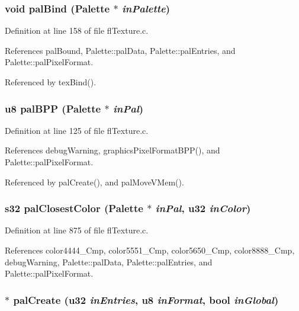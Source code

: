 \subsubsection{\setlength{\rightskip}{0pt plus 5cm}void pal\-Bind ({\bf Palette} $\ast$ {\em in\-Palette})\hspace{0.3cm}{\tt  [inline]}}\label{flTexture_8h_41e78049fb4a6e9d9f866a67042d4d51}




Definition at line 158 of file fl\-Texture.c.

References pal\-Bound, Palette::pal\-Data, Palette::pal\-Entries, and Palette::pal\-Pixel\-Format.

Referenced by tex\-Bind().
\subsubsection{\setlength{\rightskip}{0pt plus 5cm}u8 pal\-BPP ({\bf Palette} $\ast$ {\em in\-Pal})\hspace{0.3cm}{\tt  [inline]}}\label{flTexture_8h_3bc371a87c5df314b09a477704d5ee24}




Definition at line 125 of file fl\-Texture.c.

References debug\-Warning, graphics\-Pixel\-Format\-BPP(), and Palette::pal\-Pixel\-Format.

Referenced by pal\-Create(), and pal\-Move\-VMem().
\subsubsection{\setlength{\rightskip}{0pt plus 5cm}s32 pal\-Closest\-Color ({\bf Palette} $\ast$ {\em in\-Pal}, u32 {\em in\-Color})}\label{flTexture_8h_57fa8eca9371b4c3bc52915f4e871ff8}




Definition at line 875 of file fl\-Texture.c.

References color4444\_\-Cmp, color5551\_\-Cmp, color5650\_\-Cmp, color8888\_\-Cmp, debug\-Warning, Palette::pal\-Data, Palette::pal\-Entries, and Palette::pal\-Pixel\-Format.
\subsubsection{$\ast$ pal\-Create (u32 {\em in\-Entries}, u8 {\em in\-Format}, {\bf bool} {\em in\-Global})}\label{flTexture_8h_e3ed244173473fbbe4f84cc8e773ca88}




